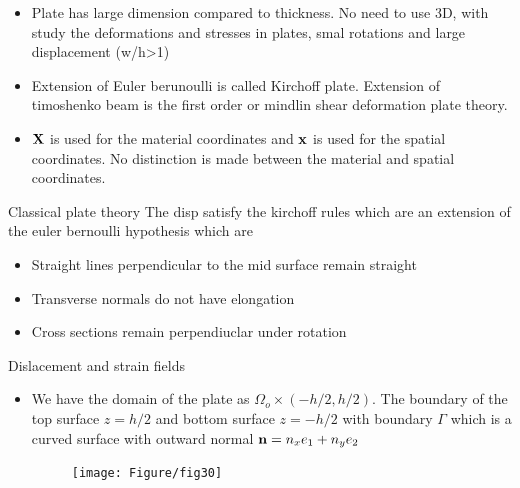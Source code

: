 	\begin{frame}
		\begin{itemize}
			\item Plate has large dimension compared to thickness. No need to use 3D, with study the deformations and stresses in plates, smal rotations and large displacement (w/h>1)
			\item Extension of Euler berunoulli is called Kirchoff plate. Extension of timoshenko beam is the first order or mindlin shear deformation plate theory.
			\item $\mathbf{X}$ is used for the material coordinates and $\mathbf{x}$ is used for the spatial coordinates. No distinction is made between the material and spatial coordinates. 	
		\end{itemize}
	\end{frame}


	\begin{frame}{Classical plate theory}
		The disp satisfy the kirchoff rules which are an extension of the euler bernoulli hypothesis which are
		\begin{itemize}
			\item Straight lines perpendicular to the mid surface remain straight
			\item Transverse normals do not have elongation
			\item Cross sections remain perpendiuclar under rotation
		\end{itemize}
	\end{frame}


	\begin{frame}{Dislacement and strain fields}
		\begin{itemize}
			\item We have the domain of the plate as $\Omega_o \times (-h/2,h/2)$. The boundary of the top surface $z = h/2$ and bottom surface $z = -h/2$ with boundary $\Gamma$ which is a curved surface with outward normal $\mathbf{n} = n_xe_1 + n_ye_2$
			\begin{figure}
				\centering
				\texttt{[image: Figure/fig30]} 		
			\end{figure}
		\end{itemize}
	\end{frame}


